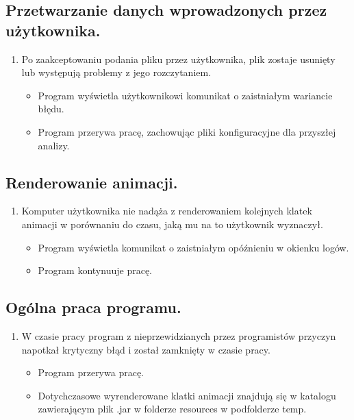 \documentclass[a4paper]{article}
\begin{document}
\subsection{Przetwarzanie danych wprowadzonych przez użytkownika.}
\begin{enumerate}
    \item Po zaakceptowaniu podania pliku przez użytkownika, plik zostaje usunięty lub występują problemy z jego rozczytaniem. 
          \begin{itemize}
              \item Program wyświetla użytkownikowi komunikat o zaistniałym wariancie błędu.
              \item Program przerywa pracę, zachowując pliki konfiguracyjne dla przyszłej analizy.
          \end{itemize}
\end{enumerate}
\subsection{Renderowanie animacji.}
\begin{enumerate}
    \item Komputer użytkownika nie nadąża z renderowaniem kolejnych klatek animacji w porównaniu do czasu, jaką mu na to użytkownik wyznaczył.
          \begin{itemize}
              \item Program wyświetla komunikat o zaistniałym opóźnieniu w okienku logów.
              \item Program kontynuuje pracę.
          \end{itemize}
\end{enumerate}
\subsection{Ogólna praca programu.}
\begin{enumerate}
    \item W czasie pracy program z nieprzewidzianych przez programistów przyczyn napotkał krytyczny błąd i został zamknięty w czasie pracy.
          \begin{itemize}
              \item Program przerywa pracę.
              \item Dotychczasowe wyrenderowane klatki animacji znajdują się w katalogu zawierającym plik .jar w folderze resources w podfolderze temp.
          \end{itemize}
\end{enumerate}
\end{document}
